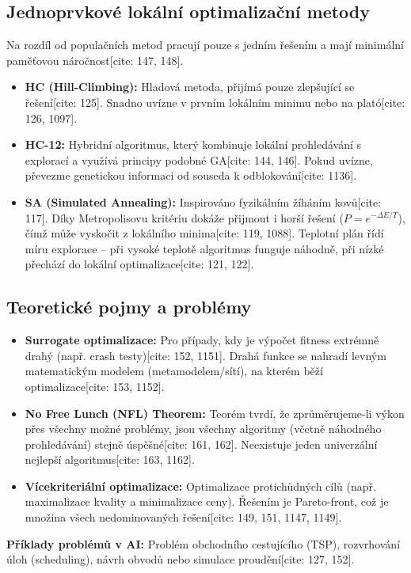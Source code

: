 \documentclass{article}
\begin{document}
\subsection{Jednoprvkové lokální optimalizační metody}
Na rozdíl od populačních metod pracují pouze s jedním řešením a mají minimální paměťovou náročnost[cite: 147, 148].
\begin{itemize}
    \item \textbf{HC (Hill-Climbing):} Hladová metoda, přijímá pouze zlepšující se řešení[cite: 125]. Snadno uvízne v prvním lokálním minimu nebo na plató[cite: 126, 1097].
    \item \textbf{HC-12:} Hybridní algoritmus, který kombinuje lokální prohledávání s explorací a využívá principy podobné GA[cite: 144, 146]. Pokud uvízne, převezme genetickou informaci od souseda k odblokování[cite: 1136].
    \item \textbf{SA (Simulated Annealing):} Inspirováno fyzikálním žíháním kovů[cite: 117]. Díky Metropolisovu kritériu dokáže přijmout i horší řešení ($P = e^{-\Delta E/T}$), čímž může vyskočit z lokálního minima[cite: 119, 1088]. Teplotní plán řídí míru explorace – při vysoké teplotě algoritmus funguje náhodně, při nízké přechází do lokální optimalizace[cite: 121, 122].
\end{itemize}

\subsection{Teoretické pojmy a problémy}
\begin{itemize}
    \item \textbf{Surrogate optimalizace:} Pro případy, kdy je výpočet fitness extrémně drahý (např. crash testy)[cite: 152, 1151]. Drahá funkce se nahradí levným matematickým modelem (metamodelem/sítí), na kterém běží optimalizace[cite: 153, 1152].
    \item \textbf{No Free Lunch (NFL) Theorem:} Teorém tvrdí, že zprůměrujeme-li výkon přes všechny možné problémy, jsou všechny algoritmy (včetně náhodného prohledávání) stejně úspěšné[cite: 161, 162]. Neexistuje jeden univerzální nejlepší algoritmus[cite: 163, 1162].
    \item \textbf{Vícekriteriální optimalizace:} Optimalizace protichůdných cílů (např. maximalizace kvality a minimalizace ceny). Řešením je Pareto-front, což je množina všech nedominovaných řešení[cite: 149, 151, 1147, 1149].
\end{itemize}
\textbf{Příklady problémů v AI:} Problém obchodního cestujícího (TSP), rozvrhování úloh (scheduling), návrh obvodů nebo simulace proudění[cite: 127, 152].
\end{document}
